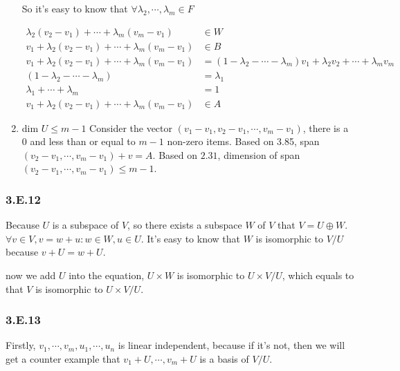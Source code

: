 \begin{enumerate}[label=(\alph*)]
So it's easy to know that $\forall \lambda_{2},\cdots, \lambda_{m} \in F$

\begin{equation*}
    \begin{split}
\lambda_{2}(v_{2}-v_{1}) + \cdots + \lambda_{m}(v_{m}-v_{1}) &\in W \\
v_{1} + \lambda_{2}(v_{2}-v_{1}) + \cdots + \lambda_{m}(v_{m}-v_{1}) &\in B \\
v_{1} + \lambda_{2}(v_{2}-v_{1}) + \cdots + \lambda_{m}(v_{m}-v_{1}) &= (1-\lambda_{2} - \cdots - \lambda_{m})v_{1} + \lambda_{2}v_{2} + \cdots + \lambda_{m}v_{m} \\
(1-\lambda_{2} - \cdots - \lambda_{m}) &= \lambda_{1} \\
\lambda_{1} + \cdots + \lambda_{m} &= 1 \\
v_{1} + \lambda_{2}(v_{2}-v_{1}) + \cdots + \lambda_{m}(v_{m}-v_{1}) &\in A
    \end{split}
\end{equation*}

\item dim $U\leq m-1$
Consider the vector $(v_{1} - v_{1}, v_{2} - v_{1}, \cdots, v_{m} - v_{1})$, there is a $0$ and less than or equal to $m-1$ non-zero items. Based on 3.85, span$(v_{2}-v_{1}, \cdots, v_{m}-v_{1}) + v = A$. Based on $2.31$, dimension of span$(v_{2}-v_{1}, \cdots, v_{m}-v_{1}) \leq m-1$.
\end{enumerate}

\subsubsection*{3.E.12}

Because $U$ is a subspace of $V$, so there exists a subspace $W$ of $V$ that $V = U \oplus W$. $\forall v\in V, v = w + u: w\in W, u\in U$. It's easy to know that $W$ is isomorphic to $V/U$ because $v+U = w + U$.

now we add $U$ into the equation, $U\times W$ is isomorphic to $U \times V/U$, which equals to that $V$ is isomorphic to $U\times V/U$.

\subsubsection*{3.E.13}

Firstly, $v_{1},\cdots,v_{m}, u_{1},\cdots,u_{n}$ is linear independent, because if it's not, then we will get a counter example that $v_{1}+U,\cdots, v_{m}+U$ is a basis of $V/U$.

